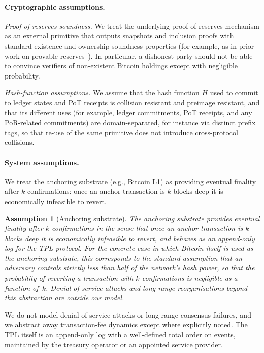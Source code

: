 \documentclass[11pt]{article}
\newtheorem{assumption}{Assumption}
\begin{document}
\paragraph{Cryptographic assumptions.}
\emph{Proof-of-reserves soundness.}
We treat the underlying proof-of-reserves mechanism as an external primitive that
outputs snapshots and inclusion proofs with standard existence and ownership soundness
properties (for example, as in prior work on provable reserves~\cite{Dagher2015,Chalkias2018}).
In particular, a dishonest party should not be able to convince verifiers of non-existent
Bitcoin holdings except with negligible probability.

\emph{Hash-function assumptions.}
We assume that the hash function $H$ used to commit to ledger states and PoT receipts
is collision resistant and preimage resistant, and that its different uses
(for example, ledger commitments, PoT receipts, and any PoR-related commitments)
are domain-separated, for instance via distinct prefix tags, so that re-use of
the same primitive does not introduce cross-protocol collisions.

\paragraph{System assumptions.}
We treat the anchoring substrate (e.g., Bitcoin L1) as providing eventual finality after $k$ confirmations:
once an anchor transaction is $k$ blocks deep it is economically infeasible to revert.

\begin{assumption}[Anchoring substrate]\label{assump:anchoring-substrate}
The anchoring substrate provides eventual finality after $k$ confirmations in the sense that once an anchor transaction is
$k$ blocks deep it is economically infeasible to revert, and behaves as an append-only log for the TPL protocol.
For the concrete case in which Bitcoin itself is used as the anchoring substrate, this corresponds to the standard
assumption that an adversary controls strictly less than half of the network's hash power, so that the probability of
reverting a transaction with $k$ confirmations is negligible as a function of~$k$.
Denial-of-service attacks and long-range reorganisations beyond this abstraction are outside our model.
\end{assumption}
We do not model denial-of-service attacks or long-range consensus failures, and we abstract away transaction-fee dynamics except where explicitly noted.
The TPL itself is an append-only log with a well-defined total order on events, maintained by the treasury operator or an appointed service provider.
\end{document}
